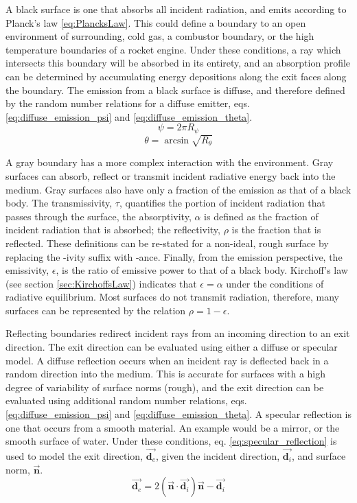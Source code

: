 A black surface is one that absorbs all incident radiation, and emits according to Planck's law \ref{eq:PlancksLaw}. 
This could define a boundary to an open environment of surrounding, cold gas, a combustor boundary, or the high temperature boundaries of a rocket engine. 
Under these conditions, a ray which intersects this boundary will be absorbed in its entirety, and an absorption profile can be determined by accumulating energy depositions along the exit faces along the boundary. The emission from a black surface is diffuse, and therefore defined by the random number relations for a diffuse emitter, eqs. \ref{eq:diffuse_emission_psi} and \ref{eq:diffuse_emission_theta}.
\begin{equation}
    \psi{}=2\pi{}R_\psi
    \label{eq:diffuse_emission_psi}
\end{equation}
\begin{equation}
    \theta = \arcsin{\sqrt{R_\theta}}
    \label{eq:diffuse_emission_theta}
\end{equation}

A gray boundary has a more complex interaction with the environment. Gray surfaces can absorb, reflect or transmit incident radiative energy back into the medium. Gray surfaces also have only a fraction of the emission as that of a black body.
The transmissivity, $\tau{}$, quantifies the portion of incident radiation that passes through the surface, the absorptivity, $\alpha$ is defined as the fraction of incident radiation that is absorbed; the reflectivity, $\rho$ is the fraction that is reflected. These definitions can be re-stated for a non-ideal, rough surface by replacing the -ivity suffix with -ance. 
Finally, from the emission perspective, the emissivity, $\epsilon$, is the ratio of emissive power to that of a black body.  Kirchoff's law (see section \ref{sec:KirchoffsLaw}) indicates that $\epsilon{}=\alpha{}$ under the conditions of radiative equilibrium.
Most surfaces do not transmit radiation, therefore, many surfaces can be represented by the relation $\rho{}=1-\epsilon$. 

Reflecting boundaries redirect incident rays from an incoming direction to an exit direction. 
The exit direction can be evaluated using either a diffuse or specular model. 
A diffuse reflection occurs when an incident ray is deflected back in a random direction into the medium. This is accurate for surfaces with a high degree of variability of surface norms (rough), and the exit direction can be evaluated using additional random number relations, eqs. \ref{eq:diffuse_emission_psi} and \ref{eq:diffuse_emission_theta}.
A specular reflection is one that occurs from a smooth material. 
An example would be a mirror, or the smooth surface of water. Under these conditions, eq. \ref{eq:specular_reflection} is used to model the exit direction, $\Vec{\textbf{d}_{e}}$, given the incident direction, $\Vec{\textbf{d}_i}$, and surface norm, $\vec{\textbf{n}}$.
\begin{equation}
    \Vec{\textbf{d}_e}=2(\Vec{\textbf{n}}\cdot\Vec{\textbf{d}_i})\Vec{\textbf{n}} -\Vec{\textbf{d}_i}
    \label{eq:specular_reflection}
\end{equation}

